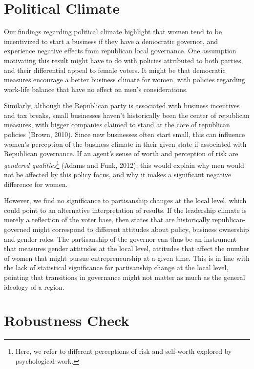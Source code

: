 \section{Political Climate}
Our findings regarding political climate highlight that women tend to be incentivized to start a business if they have a democratic governor, and experience negative effects from republican local governance. One assumption motivating this result might have to do with policies attributed to both parties, and their differential appeal to female voters. It might be that democratic measures encourage a better business climate for women, with policies regarding work-life balance that have no effect on men's considerations. 

Similarly, although the Republican party is associated with business incentives and tax breaks, small businesses haven't historically been the center of republican measures, with bigger companies claimed to stand at the core of republican policies (Brown, 2010). Since new businesses often start small, this can influence women's perception of the business climate in their given state if associated with Republican governance. If an agent's sense of worth and perception of risk are \textit{gendered qualities}\footnote{Here, we refer to different perceptions of risk and self-worth explored by psychological work.} (Adams and Funk, 2012), this would explain why men would not be affected by this policy focus, and why it makes a significant negative difference for women.


However, we find no significance to partisanship changes at the local level, which could point to an alternative interpretation of results. If the leadership climate is merely a reflection of the voter base, then states that are historically republican-governed might correspond to different attitudes about policy, business ownership and gender roles. The partisanship of the governor can thus be an instrument that measures gender attitudes at the local level, attitudes that affect the number of women that might pursue entrepreneurship at a given time. This is in line with the lack of statistical significance for partisanship change at the local level, pointing that transitions in governance might not matter as much as the general ideology of a region.




\section{Robustness Check}

